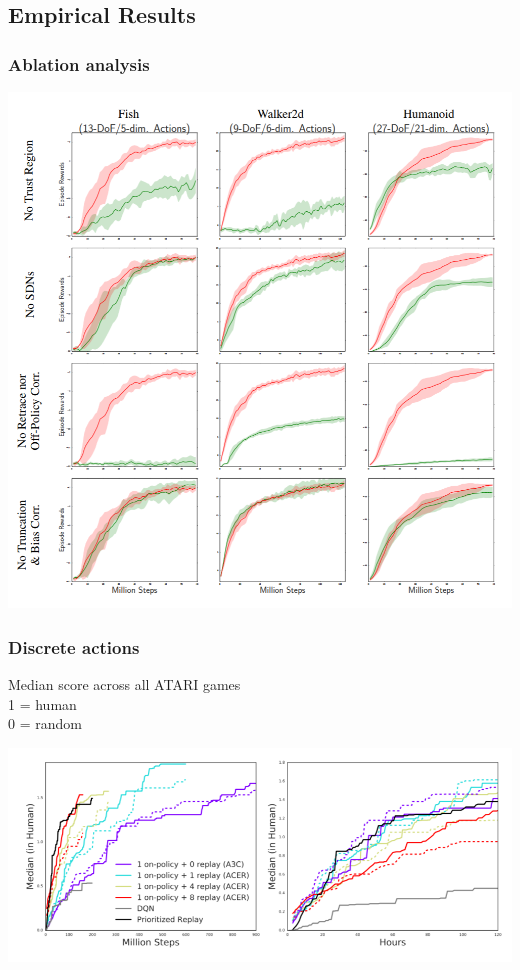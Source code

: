 \documentclass{beamer}
\begin{document}
\subsection{Empirical Results}

\begin{frame}
\frametitle{Ablation analysis}
\begin{center}
\includegraphics[scale=0.22]{ablation}
\end{center}
\end{frame}

\begin{frame}
\frametitle{Discrete actions}
Median score across all ATARI games\\
1 = human\\
0 = random
\begin{center}
\includegraphics[scale=0.34]{atari}
\end{center}
\end{frame}
\end{document}
